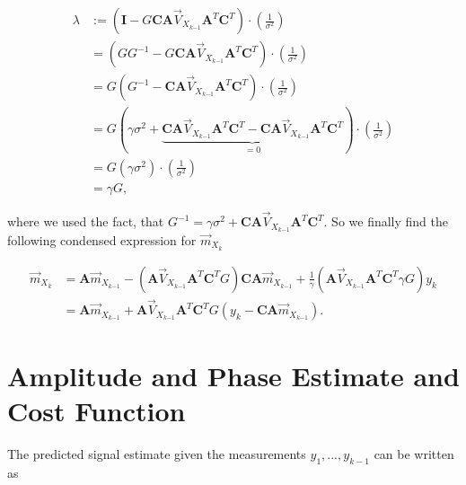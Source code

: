 \documentclass[11pt,a4paper,twoside]{report}
\newcommand{\messF}[3]{\overrightarrow{#1}_{{#2}_{k{#3}}}}
\newcommand{\mat}[1]{\mathbf{#1}}
\begin{document}
\begin{align}
	\label{eq: lambda factor}
	\lambda &:= \left(\mat{I} - G\mat{C}\mat{A}\messF{V}{X}{-1}\mat{A}^T\mat{C}^T\right) \cdot \left(\frac{1}{\sigma^2}\right) \\
	&= \left(GG^{-1} - G\mat{C}\mat{A}\messF{V}{X}{-1}\mat{A}^T\mat{C}^T\right) \cdot \left(\frac{1}{\sigma^2}\right) \\
	&= G\left(G^{-1} - \mat{C}\mat{A}\messF{V}{X}{-1}\mat{A}^T\mat{C}^T\right) \cdot \left(\frac{1}{\sigma^2}\right) \\
	&= G\left(\gamma \sigma^2 + \underbrace{\mat{C} \mat{A}\messF{V}{X}{-1} \mat{A}^T\mat{C}^T - \mat{C}\mat{A}\messF{V}{X}{-1}\mat{A}^T\mat{C}^T}_{=0}\right) \cdot \left(\frac{1}{\sigma^2}\right) \\
	&= G\left(\gamma \sigma^2 \right) \cdot \left(\frac{1}{\sigma^2}\right) \\
	&= \gamma G,
\end{align}

where we used the fact, that $G^{-1} = \gamma \sigma^2 + \mat{C} \mat{A}\messF{V}{X}{-1} \mat{A}^T\mat{C}^T$. So we finally find the following condensed expression for $\messF{m}{X}{}$

\begin{align}
	\label{eq: update rule, mean vector}
	\messF{m}{X}{} &= \mat{A} \messF{m}{X}{-1} - \left(\mat{A}\messF{V}{X}{-1}\mat{A}^T \mat{C}^T G\right)\mat{C}\mat{A}\messF{m}{X}{-1} + \frac{1}{\gamma} \left(\mat{A}\messF{V}{X}{-1}\mat{A}^T\mat{C}^T \gamma G\right) y_k \\
	&= \mat{A} \messF{m}{X}{-1} + \mat{A}\messF{V}{X}{-1}\mat{A}^T\mat{C}^T G \left( y_k - \mat{C}\mat{A}\messF{m}{X}{-1} \right).
\end{align}

%


\chapter*{Amplitude and Phase Estimate and Cost Function}
The predicted signal estimate given the measurements ${y_1,...,y_{k-1}}$ can be written as
\end{document}
